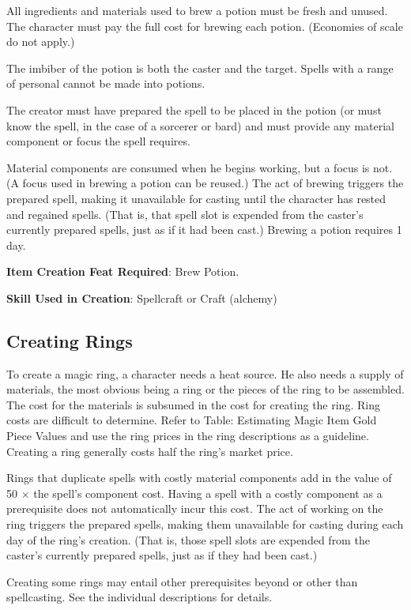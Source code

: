 All ingredients and materials used to brew a potion must be fresh and unused. The character must pay the full cost for brewing each potion. (Economies of scale do not apply.)
				
The imbiber of the potion is both the caster and the target. Spells with a range of personal cannot be made into potions.
				
The creator must have prepared the spell to be placed in the potion (or must know the spell, in the case of a sorcerer or bard) and must provide any material component or focus the spell requires.
				
Material components are consumed when he begins working, but a focus is not. (A focus used in brewing a potion can be reused.) The act of brewing triggers the prepared spell, making it unavailable for casting until the character has rested and regained spells. (That is, that spell slot is expended from the caster's currently prepared spells, just as if it had been cast.) Brewing a potion requires 1 day.
				
\textbf{Item Creation Feat Required}: Brew Potion.
				
\textbf{Skill Used in Creation}: Spellcraft or Craft (alchemy)
				
\subsection{Creating Rings}

				
To create a magic ring, a character needs a heat source. He also needs a supply of materials, the most obvious being a ring or the pieces of the ring to be assembled. The cost for the materials is subsumed in the cost for creating the ring. Ring costs are difficult to determine. Refer to Table: Estimating Magic Item Gold Piece Values and use the ring prices in the ring descriptions as a guideline. Creating a ring generally costs half the ring's market price.
				
Rings that duplicate spells with costly material components add in the value of 50 \mbox{$\times$} the spell's component cost. Having a spell with a costly component as a prerequisite does not automatically incur this cost. The act of working on the ring triggers the prepared spells, making them unavailable for casting during each day of the ring's creation. (That is, those spell slots are expended from the caster's currently prepared spells, just as if they had been cast.)
				
Creating some rings may entail other prerequisites beyond or other than spellcasting. See the individual descriptions for details.
				
